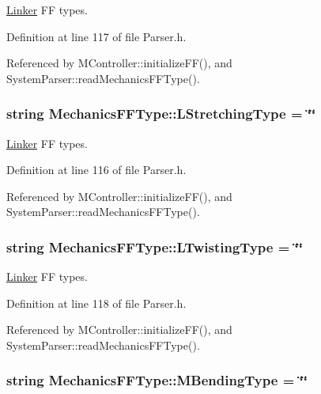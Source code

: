 \hyperlink{classLinker}{Linker} F\+F types. 



Definition at line 117 of file Parser.\+h.



Referenced by M\+Controller\+::initialize\+F\+F(), and System\+Parser\+::read\+Mechanics\+F\+F\+Type().

\hypertarget{structMechanicsFFType_a1e03399a615a236fcb90a356d274681c}{
\subsubsection[{L\+Stretching\+Type}]{\setlength{\rightskip}{0pt plus 5cm}string Mechanics\+F\+F\+Type\+::\+L\+Stretching\+Type = \char`\"{}\char`\"{}}}\label{structMechanicsFFType_a1e03399a615a236fcb90a356d274681c}


\hyperlink{classLinker}{Linker} F\+F types. 



Definition at line 116 of file Parser.\+h.



Referenced by M\+Controller\+::initialize\+F\+F(), and System\+Parser\+::read\+Mechanics\+F\+F\+Type().

\hypertarget{structMechanicsFFType_a90c249f75ff2207d3ec927e1e8da57f1}{
\subsubsection[{L\+Twisting\+Type}]{\setlength{\rightskip}{0pt plus 5cm}string Mechanics\+F\+F\+Type\+::\+L\+Twisting\+Type = \char`\"{}\char`\"{}}}\label{structMechanicsFFType_a90c249f75ff2207d3ec927e1e8da57f1}


\hyperlink{classLinker}{Linker} F\+F types. 



Definition at line 118 of file Parser.\+h.



Referenced by M\+Controller\+::initialize\+F\+F(), and System\+Parser\+::read\+Mechanics\+F\+F\+Type().

\hypertarget{structMechanicsFFType_a0bed42c13d0c33d3b37738b44494d8bf}{
\subsubsection[{M\+Bending\+Type}]{\setlength{\rightskip}{0pt plus 5cm}string Mechanics\+F\+F\+Type\+::\+M\+Bending\+Type = \char`\"{}\char`\"{}}}\label{structMechanicsFFType_a0bed42c13d0c33d3b37738b44494d8bf}


